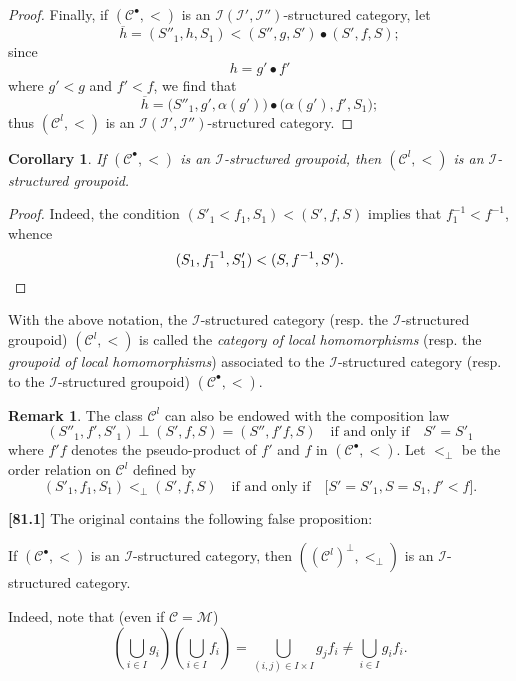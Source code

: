 \documentclass[a4paper,fleqn]{article}
\theoremstyle{plain}
\newenvironment{proposition}[1]
  {\renewcommand\theinnerproposition{#1}\innerproposition}
  {\endinnerproposition}
\newtheorem*{corollary*}{Corollary}
\theoremstyle{definition}
\newenvironment{definition}[1]
  {\renewcommand\theinnerdefinition{#1}\innerdefinition}
  {\endinnerdefinition}
\newtheorem*{remark}{Remark}
\newenvironment{longcomm}[1]
  {\noindent\textbf{[#1]}\rmfamily}
  {}
\newcommand{\oldpage}[1]{{\marginpar{\footnotesize$\bigg\vert$\,\,\,\,\textit{p.~#1}}}}
\newcommand{\CC}{\mathcal{C}}
\newcommand{\MM}{\mathcal{M}}
\newcommand{\II}{\mathcal{I}}
\newcommand{\smallbullet}{\bullet}
\begin{document}
\begin{proof}
  Finally, if $(\CC^\smallbullet,<)$ is an $\II(\II',\II'')$-structured category, let
  \[
    \overline{h}
    = (S''_1,h,S_1)
    < (S'',g,S')\smallbullet(S',f,S);
  \]
  since
  \[
    h = g'\smallbullet f'
  \]
  where $g'<g$ and $f'<f$, we find that
  \[
    \overline{h}
    = \big(S''_1,g',\alpha(g')\big)\smallbullet\big(\alpha(g'),f',S_1\big);
  \]
  thus $(\CC^l,<)$ is an $\II(\II',\II'')$-structured category.
\end{proof}

\begin{corollary*}
  If $(\CC^\smallbullet,<)$ is an $\II$-structured groupoid, then $(\CC^l,<)$ is an $\II$-structured groupoid.
\end{corollary*}

\begin{proof}
  \oldpage{409}
  Indeed, the condition $(S'_1<f_1,S_1)<(S',f,S)$ implies that $f_1^{-1}<f^{-1}$, whence
  \[
    (S_1,f_1^{-1},S'_1)
    < (S,f^{-1},S').
    \qedhere
  \]
\end{proof}

\begin{definition}{22}
\label{definition:ii-22}
  With the above notation, the $\II$-structured category (resp. the $\II$-structured groupoid) $(\CC^l,<)$ is called the \emph{category of local homomorphisms} (resp. the \emph{groupoid of local homomorphisms}) associated to the $\II$-structured category (resp. to the $\II$-structured groupoid) $(\CC^\smallbullet,<)$.
\end{definition}

\begin{remark}
  The class $\CC^l$ can also be endowed with the composition law
  \[
    (S''_1,f',S'_1)\perp(S',f,S)
    = (S'',f'f,S)
    \quad\text{if and only if}\quad
    S'=S'_1
  \]
  where $f'f$ denotes the pseudo-product of $f'$ and $f$ in $(\CC^\smallbullet,<)$.
  Let $<_\perp$ be the order relation on $\CC^l$ defined by
  \[
    (S'_1,f_1,S_1)
    <_\perp (S',f,S)
    \quad\text{if and only if}\quad
    \big[
      S'=S'_1,
      S=S_1,
      f'<f
    \big].
  \]
\end{remark}

\begin{longcomm}{81.1}
  The original contains the following false proposition:

  \begin{proposition}{26~bis}
    If $(\CC^\smallbullet,<)$ is an $\II$-structured category, then $((\CC^l)^\perp,<_\perp)$ is an $\II$-structured category.
  \end{proposition}

  Indeed, note that (even if $\CC=\MM$)
  \[
    \left(\bigcup_{i\in I}g_i\right)\left(\bigcup_{i\in I}f_i\right)
    = \bigcup_{(i,j)\in I\times I}g_jf_i
    \neq \bigcup_{i\in I}g_if_i.
  \]
\end{longcomm}
\end{document}
